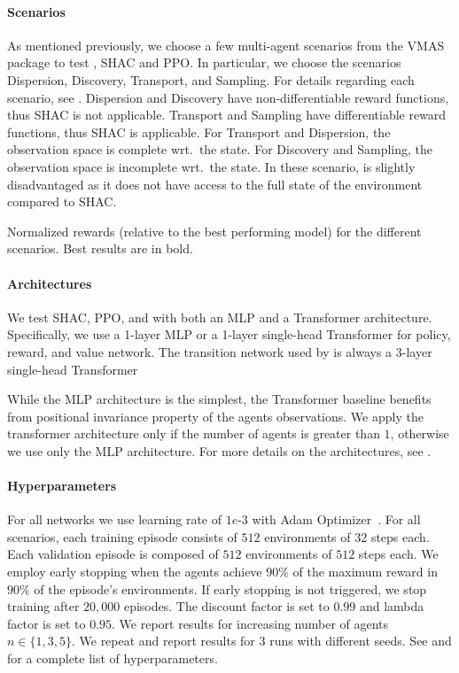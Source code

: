 \paragraph{Scenarios}
As mentioned previously, we choose a few multi-agent scenarios from the VMAS package to test \fname{}, SHAC and PPO\@. In particular, we choose the scenarios Dispersion, Discovery, Transport, and Sampling. For details regarding each scenario, see . Dispersion and Discovery have non-differentiable reward functions, thus SHAC is not applicable. Transport and Sampling have differentiable reward functions, thus SHAC is applicable. For Transport and Dispersion, the observation space is complete wrt.\ the state. For Discovery and Sampling, the observation space is incomplete wrt.\ the state. In these scenario, \fname{} is slightly disadvantaged as it does not have access to the full state of the environment compared to SHAC\@.

\begin{table}[t]
    \centering
    
    \caption{Normalized rewards (relative to the best performing model) for the different scenarios. Best results are in bold.}\label{tab:max-rewards}
\end{table}

\paragraph{Architectures}
We test SHAC, PPO, and \fname{} with both an MLP and a Transformer architecture. Specifically, we use a 1-layer MLP or a 1-layer single-head Transformer for policy, reward, and value network. The transition network used by \fname{} is always a 3-layer single-head Transformer

While the MLP architecture is the simplest, the Transformer baseline benefits from positional invariance property of the agents observations. We apply the transformer architecture only if the number of agents is greater than $1$, otherwise we use only the MLP architecture. For more details on the architectures, see .

\paragraph{Hyperparameters}
For all networks we use learning rate of $1e\text{-}3$ with Adam Optimizer~\cite{Kingma14}. For all scenarios, each training episode consists of $512$ environments of $32$ steps each. Each validation episode is composed of $512$ environments of $512$ steps each. We employ early stopping when the agents achieve $90\%$ of the maximum reward in $90\%$ of the episode's environments. If early stopping is not triggered, we stop training after $20,000$ episodes. The discount factor is set to $0.99$ and lambda factor is set to $0.95$. We report results for increasing number of agents $n\in\{1,3,5\}$. We repeat and report results for $3$ runs with different seeds. See  and  for a complete list of hyperparameters.

